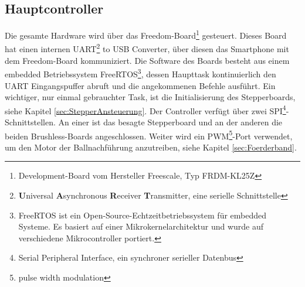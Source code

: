     \subsection{Hauptcontroller}    	
        Die gesamte Hardware wird über das Freedom-Board\footnote{Development-Board vom 
        Hersteller Freescale, Typ FRDM-KL25Z} gesteuert. Dieses Board hat einen internen UART\footnote{\textbf{U}niversal \textbf{A}synchronous \textbf{R}eceiver 
        \textbf{T}ransmitter, eine serielle Schnittstelle} to USB Converter, über diesen 
        das Smartphone mit dem Freedom-Board kommuniziert. Die Software des Boards besteht aus einem 
        embedded Betriebssystem FreeRTOS\footnote{FreeRTOS ist ein Open-Source-Echtzeitbetriebssystem 
        für embedded Systeme. Es basiert auf einer Mikrokernelarchitektur und wurde auf verschiedene 
        Mikrocontroller portiert.}, dessen Haupttask kontinuierlich den UART Eingangspuffer abruft 
        und die angekommenen Befehle ausführt. Ein wichtiger, nur einmal gebrauchter Task, 
        ist die Initialisierung des Stepperboards, siehe Kapitel \ref{sec:StepperAnsteuerung}. Der Controller 
        verfügt über zwei SPI\footnote{Serial Peripheral Interface, ein synchroner serieller Datenbus }-Schnittstellen. An einer ist das besagte Stepperboard und 
        an der anderen die beiden Brushless-Boards angeschlossen. Weiter wird ein PWM\footnote{pulse width modulation}-Port 
        verwendet, um den Motor der Ballnachführung anzutreiben, siehe Kapitel 
        \ref{sec:Foerderband}.  

   
